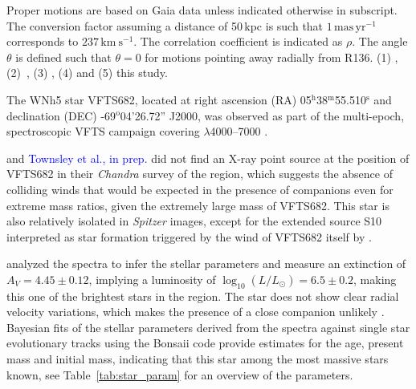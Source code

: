 \documentclass[apjl,twocolumn]{emulateapj}
\newcommand{\kms}{{\,\mathrm{km\ s^{-1}}}}
\newcommand{\masyr}{\,\mathrm{mas}\,\mathrm{yr}^{-1}}
\DeclareRobustCommand{\Tabref}[1]{Table~\ref{#1}}
\DeclareRobustCommand{\Secref}[1]{Sec.~\ref{#1}}
\begin{document}
\begin{table}
\begin{center}
\begin{tabular}{llc|c|c}
    \end{tabular}
    \tablecomments
    { Proper motions are based on Gaia data unless indicated otherwise in subscript.    The conversion factor assuming a distance of 50\,kpc is such that $1\masyr$ corresponds to $237\kms$.  The correlation coefficient is indicated as $\rho$. The angle $\theta$ is defined such that $\theta=0$ for motions pointing away radially from R136.
      (1) \cite{brown:18},
      (2)~\cite{bestenlehner:11},
    (3) \cite{lennon:18}, 
    (4) \cite{platais:18} and
    (5) {\color{blue}this study}.
    }
  \end{center}
  \label{tab:vfts682}
\end{table}

The WNh5 star VFTS682, located at right ascension (RA)
05$^\mathrm{h}$38$^\mathrm{m}$55.510$^\mathrm{s}$  and declination
(DEC) \mbox{-69$^\mathrm{o}$04'26.72''} J2000, was observed as part of the multi-epoch, spectroscopic VFTS campaign covering $\lambda$4000--7000 \citep[][]{evans:11}. 

\cite{townsley:06} and \textcolor{blue}{Townsley et al., in prep.} did not find
an X-ray point source at the position of VFTS682 in their
\emph{Chandra} survey of the region, which suggests the absence of
colliding winds that would be expected in the presence of companions
even for extreme mass ratios, given the extremely large mass of VFTS682.
This star is also relatively isolated in \emph{Spitzer} images, except for the extended
source S10 interpreted as star formation triggered by the wind of
VFTS682 itself by \cite{walborn:13}. 

\citet{bestenlehner:11}  analyzed the spectra to infer the stellar
parameters and measure an extinction of $A_V=4.45\pm0.12$, implying a
luminosity of $\log_{10}(L/L_\odot) =  6.5\pm0.2$, making this one of
the brightest stars in the region. 
%
The star does not show clear radial velocity variations, which makes the presence of a close companion unlikely
 \citet{bestenlehner:11}. 
% 
%
 Bayesian fits of the stellar parameters derived from the spectra against single star evolutionary tracks \citep{brott:11, kohler:15}
using the Bonsaii code \citep{schneider:17, schneider:18} provide
estimates for the age, present mass and initial mass, indicating that
this star among the most massive stars known, see
\Tabref{tab:star_param} for an overview of the parameters.
\end{document}
